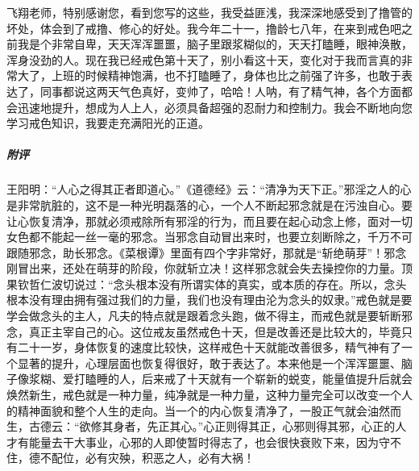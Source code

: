 \begin{case}
    飞翔老师，特别感谢您，看到您写的这些，我受益匪浅，我深深地感受到了撸管的坏处，体会到了戒撸、修心的好处。我今年二十一，撸龄七八年，在来到戒色吧之前我是个非常自卑，天天浑浑噩噩，脑子里跟浆糊似的，天天打瞌睡，眼神涣散，浑身没劲的人。现在我已经戒色第十天了，别小看这十天，变化对于我而言真的非常大了，上班的时候精神饱满，也不打瞌睡了，身体也比之前强了许多，也敢于表达了，同事都说这两天气色真好，变帅了，哈哈！人呐，有了精气神，各个方面都会迅速地提升，想成为人上人，必须具备超强的忍耐力和控制力。我会不断地向您学习戒色知识，我要走充满阳光的正道。
    \subparagraph{附评} 王阳明：“人心之得其正者即道心。”《道德经》云：“清净为天下正。”邪淫之人的心是非常肮脏的，这不是一种光明磊落的心，一个人不断起邪念就是在污浊自心。要让心恢复清净，那就必须戒除所有邪淫的行为，而且要在起心动念上修，面对一切女色都不能起一丝一毫的邪念。当邪念自动冒出来时，也要立刻断除之，千万不可跟随邪念，助长邪念。《菜根谭》里面有四个字非常好，那就是“斩绝萌芽”！邪念刚冒出来，还处在萌芽的阶段，你就斩立决！这样邪念就会失去操控你的力量。顶果钦哲仁波切说过：“念头根本没有所谓实体的真实，或本质的存在。所以，念头根本没有理由拥有强过我们的力量，我们也没有理由沦为念头的奴隶。”戒色就是要学会做念头的主人，凡夫的特点就是跟着念头跑，做不得主，而戒色就是要斩断邪念，真正主宰自己的心。这位戒友虽然戒色十天，但是改善还是比较大的，毕竟只有二十一岁，身体恢复的速度比较快，这样戒色十天就能改善很多，精气神有了一个显著的提升，心理层面也恢复得很好，敢于表达了。本来他是一个浑浑噩噩、脑子像浆糊、爱打瞌睡的人，后来戒了十天就有一个崭新的蜕变，能量值提升后就会焕然新生，戒色就是一种力量，纯净就是一种力量，这种力量完全可以改变一个人的精神面貌和整个人生的走向。当一个的内心恢复清净了，一股正气就会油然而生，古德云：“欲修其身者，先正其心。”心正则得其正，心邪则得其邪，心正的人才有能量去干大事业，心邪的人即使暂时得志了，也会很快衰败下来，因为守不住，德不配位，必有灾殃，积恶之人，必有大祸！
\end{case}

